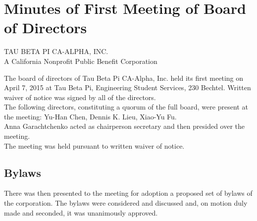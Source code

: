 \documentclass{article}
\begin{document}
	
	\vspace{1 cm}
	\noindent \makebox[\textwidth][l]{
		\makebox[9cm][l] {\hrulefill} \hfill 
		\makebox[5cm][l] {\hrulefill} 
	}
	\noindent {}
	
	\vspace{1 cm}
	\noindent \makebox[\textwidth][l]{
		\makebox[9cm][l] {\hrulefill} \hfill 
		\makebox[5cm][l] {\hrulefill} 
	}
	\noindent {}
	
	\vspace{1cm}
	\noindent \makebox[\textwidth][l]{
		\makebox[9cm][l] {\hrulefill} \hfill 
		\makebox[5cm][l] {\hrulefill} 
	}
	\noindent {}
	\pagebreak
	\section*{Minutes of First Meeting of Board of Directors}
	\begin{large}
		\uppercase{Tau Beta Pi CA-Alpha, Inc.} \\
		A California Nonprofit Public Benefit Corporation\\
	\end{large} 
	
	\noindent The board of directors of Tau Beta Pi CA-Alpha, Inc. held its first meeting on April 7, 2015 at Tau Beta Pi, Engineering Student Services, 230 Bechtel. Written waiver of notice was signed by all of the directors.\\
	
	\noindent The following directors, constituting a quorum of the full board, were present at the meeting: Yu-Han Chen, Dennis K. Lieu, Xiao-Yu Fu.\\
	
	\noindent Anna Garachtchenko acted as chairperson secretary and then presided over the meeting.\\
	
	\noindent The meeting was held pursuant to written waiver of notice.
	
	\subsection*{Bylaws}
	There was then presented to the meeting for adoption a proposed set of bylaws of the corporation. The bylaws were considered and discussed and, on motion duly made and seconded, it was unanimously approved.
	
\end{document}
